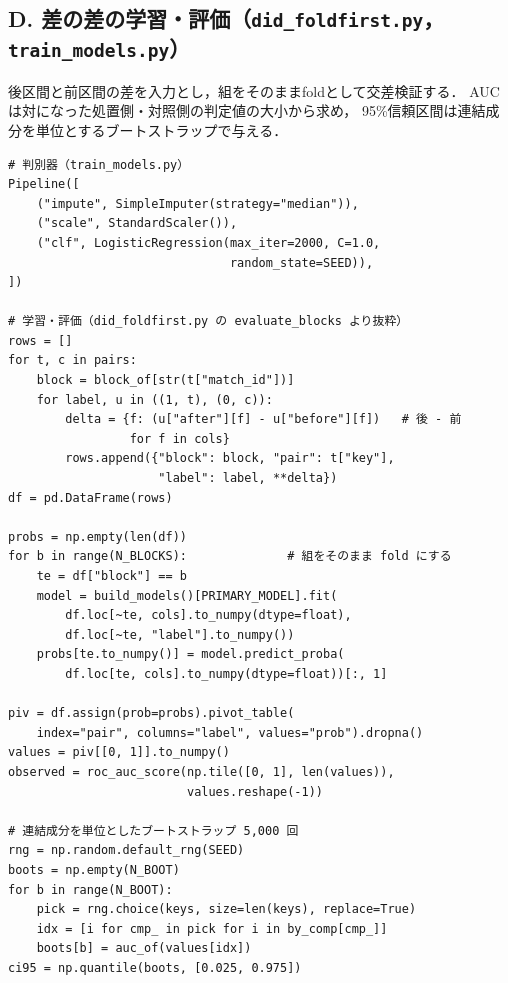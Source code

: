 \subsection*{D. 差の差の学習・評価（\texttt{did\_foldfirst.py}，\texttt{train\_models.py}）}

後区間と前区間の差を入力とし，組をそのままfoldとして交差検証する．
AUCは対になった処置側・対照側の判定値の大小から求め，
95\%信頼区間は連結成分を単位とするブートストラップで与える．

\begin{verbatim}
# 判別器（train_models.py）
Pipeline([
    ("impute", SimpleImputer(strategy="median")),
    ("scale", StandardScaler()),
    ("clf", LogisticRegression(max_iter=2000, C=1.0,
                               random_state=SEED)),
])

# 学習・評価（did_foldfirst.py の evaluate_blocks より抜粋）
rows = []
for t, c in pairs:
    block = block_of[str(t["match_id"])]
    for label, u in ((1, t), (0, c)):
        delta = {f: (u["after"][f] - u["before"][f])   # 後 - 前
                 for f in cols}
        rows.append({"block": block, "pair": t["key"],
                     "label": label, **delta})
df = pd.DataFrame(rows)

probs = np.empty(len(df))
for b in range(N_BLOCKS):              # 組をそのまま fold にする
    te = df["block"] == b
    model = build_models()[PRIMARY_MODEL].fit(
        df.loc[~te, cols].to_numpy(dtype=float),
        df.loc[~te, "label"].to_numpy())
    probs[te.to_numpy()] = model.predict_proba(
        df.loc[te, cols].to_numpy(dtype=float))[:, 1]

piv = df.assign(prob=probs).pivot_table(
    index="pair", columns="label", values="prob").dropna()
values = piv[[0, 1]].to_numpy()
observed = roc_auc_score(np.tile([0, 1], len(values)),
                         values.reshape(-1))

# 連結成分を単位としたブートストラップ 5,000 回
rng = np.random.default_rng(SEED)
boots = np.empty(N_BOOT)
for b in range(N_BOOT):
    pick = rng.choice(keys, size=len(keys), replace=True)
    idx = [i for cmp_ in pick for i in by_comp[cmp_]]
    boots[b] = auc_of(values[idx])
ci95 = np.quantile(boots, [0.025, 0.975])
\end{verbatim}
